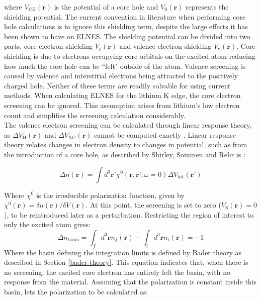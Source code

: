 where $V_{\mathrm{CH}}(\textbf{r})$ is the potential of a core hole and  $V_{\mathrm{S}}(\textbf{r})$ represents the shielding potential.  The current convention in literature when performing core hole calculations is to ignore this shielding term, despite the large effects it has been shown to have on ELNES.  The shielding potential can be divided into two parts, core electron shielding $V_{\mathrm{c}}(\textbf{r})$ and valence electron shielding  $V_{\mathrm{v}}(\textbf{r})$. Core shielding is due to electrons occupying core orbitals on the excited atom reducing how much the core hole can be ``felt" outside of the atom.  Valence screening is caused by valence and interstitial electrons being attracted to the positively charged hole.  Neither of these terms are readily solvable for using current methods.  When calculating ELNES for the lithium K edge, the core electron screening can be ignored.  This assumption arises from lithium's low electron count and simplifies the screening calculation considerably. \\

The valence electron screening can be calculated through linear response theory, as  $\Delta V_{\mathrm{H}}(\textbf{r})$ and $\Delta V_{\mathrm{XC}}(\textbf{r})$ cannot be computed exactly  \cite{shirley_modeling_2005}.  Linear response theory relates changes in electron density to changes in potential, such as from the introduction of a core hole, as described by Shirley, Soininen and Rehr is \cite{shirley_modeling_2005}:

\begin{equation}
\Delta n(\textbf{r}) = \int d^3 \textbf{r'} \chi^0(\textbf{r},\textbf{r'}; \omega = 0)\Delta V_{\mathrm{tot}}(\textbf{r'})
\end{equation}

Where $\chi^0$ is the irreducible polarization function, given by $\chi^0(\textbf{r}) = \delta n(\textbf{r}) /  \delta V(\textbf{r})$.  At this point, the screening is set to zero ($V_{\mathrm{S}}(\textbf{r})=0$), to be reintroduced later as a perturbation.  Restricting the region of interest to only the excited atom gives:
\begin{equation}
\Delta n _{\mathrm{basin}} = \int_{f}d^3\textbf{r} n_{f}(\textbf{r}) - \int_{i}d^3\textbf{r} n_i(\textbf{r})= -1
\label{density_calc}
\end{equation}
Where the basin defining the integration limits is defined by Bader theory as described in Section \ref{bader-theory}. This equation indicates that, when there is no screening,  the excited core electron has entirely left the basin, with no response from the material. Assuming that the polarization is constant inside this basin, lets the polarization to be calculated as: 

